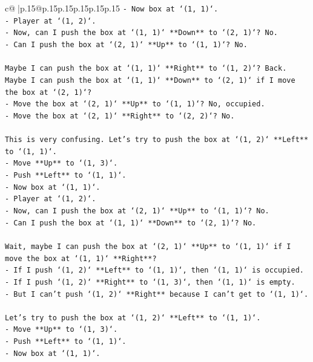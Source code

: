 \documentclass{article}
\begin{document}
{\begin{supertabular}{c@{$\;$}|p{.15\linewidth}@{}p{.15\linewidth}p{.15\linewidth}p{.15\linewidth}p{.15\linewidth}p{.15\linewidth}}
{{{\texttt{{-} Now box at `(1, 1)`.} \\
\texttt{{-} Player at `(1, 2)`.} \\
\texttt{{-} Now, can I push the box at `(1, 1)` **Down** to `(2, 1)`? No.} \\
\texttt{{-} Can I push the box at `(2, 1)` **Up** to `(1, 1)`? No.} \\
\\ 
\texttt{Maybe I can push the box at `(1, 1)` **Right** to `(1, 2)`? Back.} \\
\texttt{Maybe I can push the box at `(1, 1)` **Down** to `(2, 1)` if I move the box at `(2, 1)`?} \\
\texttt{{-} Move the box at `(2, 1)` **Up** to `(1, 1)`? No, occupied.} \\
\texttt{{-} Move the box at `(2, 1)` **Right** to `(2, 2)`? No.} \\
\\ 
\texttt{This is very confusing. Let's try to push the box at `(1, 2)` **Left** to `(1, 1)`.} \\
\texttt{{-} Move **Up** to `(1, 3)`.} \\
\texttt{{-} Push **Left** to `(1, 1)`.} \\
\texttt{{-} Now box at `(1, 1)`.} \\
\texttt{{-} Player at `(1, 2)`.} \\
\texttt{{-} Now, can I push the box at `(2, 1)` **Up** to `(1, 1)`? No.} \\
\texttt{{-} Can I push the box at `(1, 1)` **Down** to `(2, 1)`? No.} \\
\\ 
\texttt{Wait, maybe I can push the box at `(2, 1)` **Up** to `(1, 1)` if I move the box at `(1, 1)` **Right**?} \\
\texttt{{-} If I push `(1, 2)` **Left** to `(1, 1)`, then `(1, 1)` is occupied.} \\
\texttt{{-} If I push `(1, 2)` **Right** to `(1, 3)`, then `(1, 1)` is empty.} \\
\texttt{{-} But I can't push `(1, 2)` **Right** because I can't get to `(1, 1)`.} \\
\\ 
\texttt{Let's try to push the box at `(1, 2)` **Left** to `(1, 1)`.} \\
\texttt{{-} Move **Up** to `(1, 3)`.} \\
\texttt{{-} Push **Left** to `(1, 1)`.} \\
\texttt{{-} Now box at `(1, 1)`.} \\
}}}
\end{supertabular}}
\end{document}
